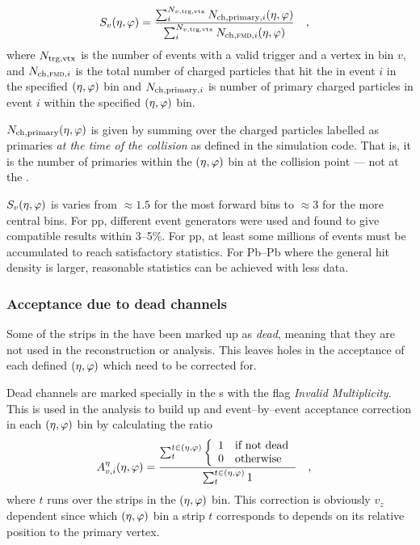 \documentclass[11pt]{article}
\def\AlwaysText#1{\ifmmode\relax\text{#1}\else #1\fi}
\newcommand{\AbbrName}[1]{\AlwaysText{{\scshape #1}}}
\newcommand{\ESD}{\AbbrName{esd}}
\newcommand{\FMD}[1][]{\AbbrName{fmd\ifx|#1|\else#1\fi}}
\newcommand{\mult}[1][]{\ensuremath N_{\text{ch}#1}}
\newcommand{\Ntrgvtx}[1][]{{\ensuremath N_{#1\text{trg,vtx}}}}
\newcommand{\etaphi}{\ensuremath(\eta,\varphi)}
\newcommand{\DeadCh}{\ensuremath A^{\eta}_{v,i}\etaphi}
\newcommand{\SecMap}{\ensuremath S_v\etaphi}
\begin{document}
\begin{align}
  \label{eq:secondary}
  \SecMap{} &=
  \frac{\sum_i^{\Ntrgvtx[v,]}\mult[,\text{primary},i]\etaphi}{
    \sum_i^{\Ntrgvtx[v,]}\mult[,\text{\FMD{}},i]\etaphi}\quad,
\end{align}
where $\Ntrgvtx$ is the number of events with a valid trigger and a
vertex in bin $v$, and $\mult[,\FMD{},i]$ is the total number of
charged particles that hit the \FMD{} in event $i$ in the specified
$\etaphi$ bin and $\mult[,\text{primary},i]$ is number of
primary charged particles in event $i$ within the specified
$\etaphi$ bin.

$\mult[,\text{primary}]\etaphi$ is given by summing over the
charged particles labelled as primaries \emph{at the time of the
  collision} as defined in the simulation code.  That is, it is the
number of primaries within the $\etaphi$ bin at the collision
point --- not at the \FMD{}.

$\SecMap$ is varies from $\approx 1.5$ for the most forward bins to
$\approx 3$ for the more central bins.  For pp, different event
generators were used and found to give compatible results within
3--5\%.   For pp, at least some millions of events must be
accumulated to reach satisfactory statistics.  For Pb--Pb where the
general hit density is larger, reasonable statistics can be achieved
with less data.  

\subsubsection{Acceptance due to dead channels}

Some of the strips in the \FMD{} have been marked up as \emph{dead},
meaning that they are not used in the reconstruction or analysis.
This leaves holes in the acceptance of each defined $\etaphi$
which need to be corrected for.  

Dead channels are marked specially in the \ESD{}s with the flag
\textit{Invalid Multiplicity}.  This is used in the analysis to build
up and event--by--event acceptance correction in each $\etaphi$
bin by calculating the ratio
\begin{align}
  \label{eq:dead_channels} 
  \DeadCh{} &= 
  \frac{\sum_t^{t\in\etaphi}\left\{\begin{array}{cl}
        1 & \text{if not dead}\\
        0 & \text{otherwise}
      \end{array}\right.}{\sum_t^{t\in\etaphi} 1}\quad,
\end{align}
where $t$ runs over the strips in the $\etaphi$ bin.  This correction
is obviously $v_z$ dependent since which $\etaphi$ bin a strip $t$
corresponds to depends on its relative position to the primary vertex.
\end{document}
